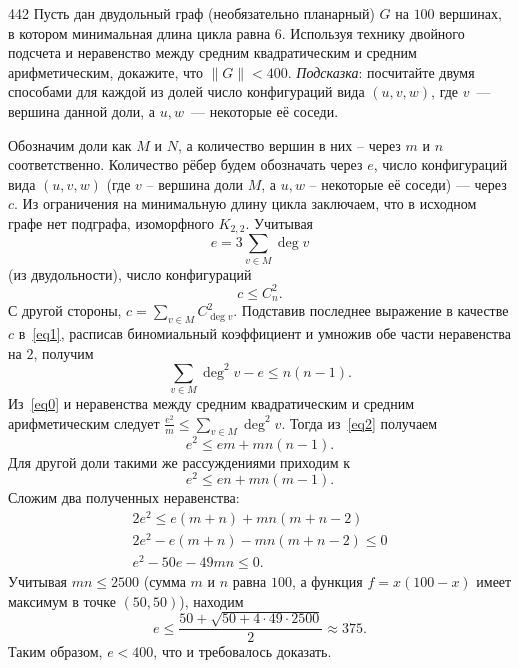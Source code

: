 \begin{task}{442}
Пусть дан двудольный граф (необязательно планарный) \(G\) на \(100\) вершинах, в котором минимальная длина цикла равна \(6\). Используя технику двойного подсчета и неравенство между средним квадратическим и средним арифметическим, докажите, что \(\|G\| < 400\). \textit{Подсказка}: посчитайте двумя способами для каждой из долей число конфигураций вида \((u,v,w)\), где \(v\)~--- вершина данной доли, а \(u,w\)~--- некоторые её соседи.
\end{task}

\begin{solution}
Обозначим доли как $M$ и $N$, а количество вершин в них -- через $m$ и $n$ соответственно. Количество рёбер будем обозначать через $e$, число конфигураций вида $(u,v,w)$ (где $v$ -- вершина доли $M$, а $u,w$ -- некоторые её соседи) --- через $c$. Из ограничения на минимальную длину цикла заключаем, что в исходном графе нет подграфа, изоморфного $K_{2,2}$. Учитывая
\begin{equation}\label{eq0}
    e=3 \sum_{v\in M}{\deg{v}}
\end{equation}
(из двудольности), число конфигураций \begin{equation}\label{eq1}
c \leq C_{n}^{2}.
\end{equation} С другой стороны, $c = \sum\limits_{v\in M} C_{\deg{v}}^{2}.$ Подставив последнее выражение в качестве $c$ в~\eqref{eq1}, расписав биномиальный коэффициент и умножив обе части неравенства на $2$, получим
\begin{equation}\label{eq2}
\sum_{v\in M} {\deg^2{v}} - e \leq n(n-1).
\end{equation}
Из~\eqref{eq0} и неравенства между средним квадратическим и средним арифметическим следует $\frac{e^2}{m} \leq \sum\limits_{v\in M}{\deg^2{v}}$. Тогда из~\eqref{eq2} получаем
\[ e^2 \leq em + mn(n-1).\]
Для другой доли такими же рассуждениями приходим к
\[e^2 \leq en + mn(m-1).\]
Сложим два полученных неравенства:
\begin{gather*}
2e^2 \leq e(m + n) + mn(m + n - 2) \\
2e^2 - e(m + n) - mn(m + n - 2) \leq 0 \\
e^2 - 50e - 49mn \leq 0.
\end{gather*}
Учитывая $mn \leq 2500$ (сумма $m$ и $n$ равна $100$, а функция $f=x(100-x)$ имеет максимум в точке $(50, 50)$), находим
\[ e \leq \frac{50 + \sqrt{50 + 4 \cdot 49 \cdot 2500}}{2} \approx 375. \]
Таким образом, $e < 400$, что и требовалось доказать.
\end{solution}
